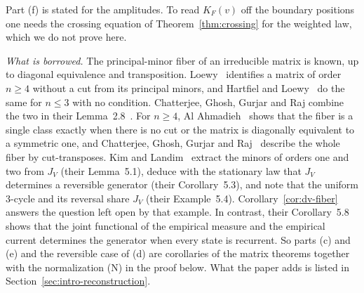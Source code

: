 Part (f) is stated for the amplitudes. To read $K_F(v)$ off the boundary
positions one needs the crossing equation of Theorem~\ref{thm:crossing} for the
weighted law, which we do not prove here.

\emph{What is borrowed.} The principal-minor fiber of an
irreducible matrix is known, up to diagonal equivalence and transposition.
Loewy~\cite[Theorem~1]{loewy1986} identifies a matrix of order $n\ge4$ without a
cut from its principal minors, and Hartfiel and
Loewy~\cite[Theorem~3]{hartfielloewy1984} do the same for $n\le3$ with no
condition. Chatterjee, Ghosh, Gurjar and Raj combine the two in their
Lemma~2.8~\cite{cggr2024}. For $n\ge4$, Al
Ahmadieh~\cite[Theorem~4.1 and Lemma~4.5]{alahmadieh2023} shows that the fiber is
a single class exactly when there is no cut or the matrix is diagonally
equivalent to a symmetric one, and Chatterjee, Ghosh, Gurjar and
Raj~\cite[Theorem~1.1]{cggr2024} describe the whole fiber by cut-transposes.
Kim and Landim~\cite[Section~5]{kl2024} extract the minors of orders one and two
from $J_V$ (their Lemma~5.1), deduce with the stationary law that $J_V$
determines a reversible generator (their Corollary~5.3), and note that the
uniform $3$-cycle and its reversal share $J_V$ (their Example~5.4).
Corollary~\ref{cor:dv-fiber} answers the question left open by that example. In
contrast, their Corollary~5.8 shows that the joint functional of the empirical
measure and the empirical current determines the generator when every state is
recurrent. So parts (c) and (e) and the reversible case of (d) are corollaries of
the matrix theorems together with the normalization (N) in the proof below. What
the paper adds is listed in Section~\ref{sec:intro-reconstruction}.

